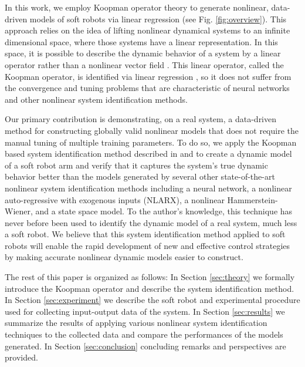 In this work, we employ Koopman operator theory to generate nonlinear, data-driven models of soft robots via linear regression (see Fig. \ref{fig:overview}).
This approach relies on the idea of lifting nonlinear dynamical systems to an infinite dimensional space, where those systems have a linear representation.
In this space, it is possible to describe the dynamic behavior of a system by a linear operator rather than a nonlinear vector field \cite{budivsic2012applied}.
This linear operator, called the Koopman operator, is identified via linear regression \cite{williams2015data}, so it does not suffer from the convergence and tuning problems that are characteristic of neural networks and other nonlinear system identification methods.


Our primary contribution is demonstrating, on a real system, a data-driven method for constructing globally valid nonlinear models that does not require the manual tuning of multiple training parameters.
To do so, we apply the Koopman based system identification method described in \cite{mauroy2016linear} and \cite{mauroy2017koopman} to create a dynamic model of a soft robot arm and verify that it captures the system's true dynamic behavior better than the models generated by several other state-of-the-art nonlinear system identification methods including a neural network, a nonlinear auto-regressive with exogenous inputs (NLARX), a nonlinear Hammerstein-Wiener, and a state space model.
To the author's knowledge, this technique has never before been used to identify the dynamic model of a real system, much less a soft robot.
We believe that this system identification method applied to soft robots will enable the rapid development of new and effective control strategies by making accurate nonlinear dynamic models easier to construct.


The rest of this paper is organized as follows:
In Section \ref{sec:theory} we formally introduce the Koopman operator and describe the system identification method. 
In Section \ref{sec:experiment} we describe the soft robot and experimental procedure used for collecting input-output data of the system.
In Section \ref{sec:results} we summarize the results of applying various nonlinear system identification techniques to the collected data and compare the performances of the models generated. 
In Section \ref{sec:conclusion} concluding remarks and perspectives are provided.